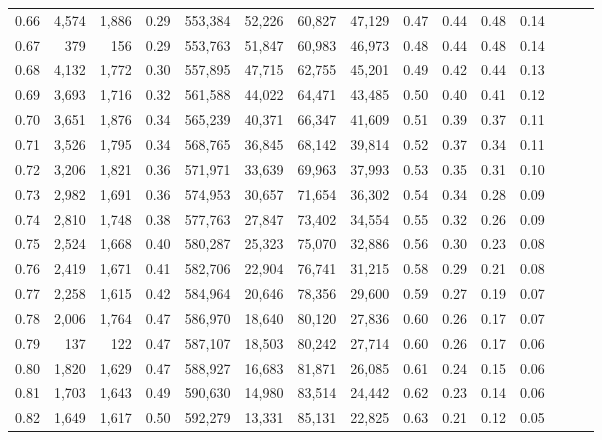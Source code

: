 \begin{tabular}{rrrrrrrrrrrrrrr}
0.66 &   4,574 &  1,886 &  0.29 &  553,384 &   52,226 &   60,827 &   47,129 &  0.47 &  0.44 &  0.48 &      0.14 \\
0.67 &     379 &    156 &  0.29 &  553,763 &   51,847 &   60,983 &   46,973 &  0.48 &  0.44 &  0.48 &      0.14 \\
0.68 &   4,132 &  1,772 &  0.30 &  557,895 &   47,715 &   62,755 &   45,201 &  0.49 &  0.42 &  0.44 &      0.13 \\
0.69 &   3,693 &  1,716 &  0.32 &  561,588 &   44,022 &   64,471 &   43,485 &  0.50 &  0.40 &  0.41 &      0.12 \\
0.70 &   3,651 &  1,876 &  0.34 &  565,239 &   40,371 &   66,347 &   41,609 &  0.51 &  0.39 &  0.37 &      0.11 \\
0.71 &   3,526 &  1,795 &  0.34 &  568,765 &   36,845 &   68,142 &   39,814 &  0.52 &  0.37 &  0.34 &      0.11 \\
0.72 &   3,206 &  1,821 &  0.36 &  571,971 &   33,639 &   69,963 &   37,993 &  0.53 &  0.35 &  0.31 &      0.10 \\
0.73 &   2,982 &  1,691 &  0.36 &  574,953 &   30,657 &   71,654 &   36,302 &  0.54 &  0.34 &  0.28 &      0.09 \\
0.74 &   2,810 &  1,748 &  0.38 &  577,763 &   27,847 &   73,402 &   34,554 &  0.55 &  0.32 &  0.26 &      0.09 \\
0.75 &   2,524 &  1,668 &  0.40 &  580,287 &   25,323 &   75,070 &   32,886 &  0.56 &  0.30 &  0.23 &      0.08 \\
0.76 &   2,419 &  1,671 &  0.41 &  582,706 &   22,904 &   76,741 &   31,215 &  0.58 &  0.29 &  0.21 &      0.08 \\
0.77 &   2,258 &  1,615 &  0.42 &  584,964 &   20,646 &   78,356 &   29,600 &  0.59 &  0.27 &  0.19 &      0.07 \\
0.78 &   2,006 &  1,764 &  0.47 &  586,970 &   18,640 &   80,120 &   27,836 &  0.60 &  0.26 &  0.17 &      0.07 \\
0.79 &     137 &    122 &  0.47 &  587,107 &   18,503 &   80,242 &   27,714 &  0.60 &  0.26 &  0.17 &      0.06 \\
0.80 &   1,820 &  1,629 &  0.47 &  588,927 &   16,683 &   81,871 &   26,085 &  0.61 &  0.24 &  0.15 &      0.06 \\
0.81 &   1,703 &  1,643 &  0.49 &  590,630 &   14,980 &   83,514 &   24,442 &  0.62 &  0.23 &  0.14 &      0.06 \\
0.82 &   1,649 &  1,617 &  0.50 &  592,279 &   13,331 &   85,131 &   22,825 &  0.63 &  0.21 &  0.12 &      0.05 \\

\end{tabular}
